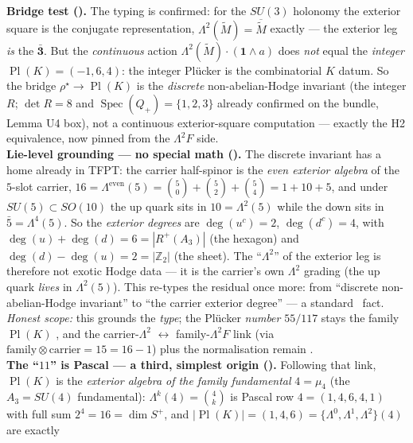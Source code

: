 \documentclass[11pt,a4paper]{article}
\newcommand{\Z}{\mathbb Z}
\begin{document}
\begin{keybox}
\smallskip\\
\noindent\textbf{Bridge test ().} The typing is confirmed: for the $SU(3)$
holonomy the exterior square is the conjugate representation, $\Lambda^2(\widetilde M)=\overline{\widetilde
M}$ exactly --- the exterior leg \emph{is} the $\mathbf{\bar3}$. But the \emph{continuous} action
$\Lambda^2(\widetilde M)\cdot(\mathbf1\wedge a)$ does \emph{not} equal the \emph{integer} $\operatorname{Pl}(K)=(-1,6,4)$:
the integer Plücker is the combinatorial $K$ datum. So the bridge $\rho^\star\!\to\!\operatorname{Pl}(K)$ is
the \emph{discrete} non-abelian-Hodge invariant (the integer $R$; $\det R=8$ and
$\operatorname{Spec}(Q_+)=\{1,2,3\}$ already confirmed on the bundle, Lemma U4 box), not a continuous
exterior-square computation --- exactly the H2 equivalence, now pinned from the $\Lambda^2F$ side.
\smallskip\\
\noindent\textbf{Lie-level grounding --- no special math ().} The discrete
invariant has a home already in TFPT: the carrier half-spinor is the \emph{even exterior algebra} of the
$5$-slot carrier, $16=\Lambda^{\mathrm{even}}(5)=\binom50+\binom52+\binom54=1+10+5$, and under
$SU(5)\subset SO(10)$ the up quark sits in $10=\Lambda^2(5)$ while the down sits in
$\bar5=\Lambda^4(5)$. So the \emph{exterior degrees} are $\deg(u^c)=2$, $\deg(d^c)=4$, with
$\deg(u){+}\deg(d)=6=|R^+(A_3)|$ (the hexagon) and $\deg(d){-}\deg(u)=2=|\Z_2|$ (the sheet). The
``$\Lambda^2$'' of the exterior leg is therefore not exotic Hodge data --- it is the carrier's own
$\Lambda^2$ grading (the up quark \emph{lives} in $\Lambda^2(5)$). This re-types the residual once more:
from ``discrete non-abelian-Hodge invariant'' to ``the carrier exterior degree'' --- a standard \mE\ fact.
\emph{Honest scope:} this grounds the \emph{type}; the Plücker \emph{number} $55/117$ stays the family
$\operatorname{Pl}(K)$ \mE, and the carrier-$\Lambda^2$ $\leftrightarrow$ family-$\Lambda^2F$ link (via
$\text{family}\otimes\text{carrier}=15=16{-}1$) plus the normalisation remain \mC.
\smallskip\\
\noindent\textbf{The ``$11$'' is Pascal --- a third, simplest origin ().}
Following that link, $\operatorname{Pl}(K)$ is the \emph{exterior algebra of the family fundamental}
$4=\mu_4$ (the $A_3{=}SU(4)$ fundamental): $\Lambda^k(4)=\binom4k$ is Pascal row $4=(1,4,6,4,1)$ with full
sum $2^4=16=\dim S^+$, and $|\operatorname{Pl}(K)|=(1,4,6)=\{\Lambda^0,\Lambda^1,\Lambda^2\}(4)$ are exactly

\end{keybox}
\end{document}
